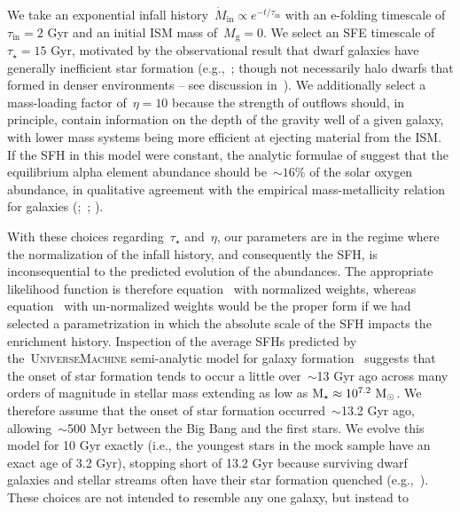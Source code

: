 We take an exponential infall history~$\dot{M}_\text{in} \propto e^{-t /
\tau_\text{in}}$ with an e-folding timescale of~$\tau_\text{in} = 2$ Gyr and an
initial ISM mass of~$M_\text{g} = 0$.
We select an SFE timescale of~$\tau_\star = 15$ Gyr, motivated by the
observational result that dwarf galaxies have generally inefficient star
formation (e.g.,~\citealp{Hudson2015}; though not necessarily halo dwarfs that
formed in denser environments -- see discussion in~\citealt{Naidu2022}).
We additionally select a mass-loading factor of~$\eta = 10$ because the
strength of outflows should, in principle, contain information on the depth of
the gravity well of a given galaxy, with lower mass systems being more
efficient at ejecting material from the ISM.
If the SFH in this model were constant, the analytic formulae of
\citet{Weinberg2017b} suggest that the equilibrium alpha element abundance
should be~$\sim16$\% of the solar oxygen abundance, in qualitative agreement
with the empirical mass-metallicity relation for galaxies
(\citealp{Tremonti2004, Gallazzi2005};~\citealp*{Zahid2011};
\citealp{Andrews2013, Kirby2013, Zahid2014}).
\par
With these choices regarding~$\tau_\star$ and~$\eta$, our parameters are in
the regime where the normalization of the infall history, and consequently the
SFH, is inconsequential to the predicted evolution of the abundances.
The appropriate likelihood function is therefore equation~
with normalized weights, whereas equation~ with
un-normalized weights would be the proper form if we had selected a
parametrization in which the absolute scale of the SFH impacts the enrichment
history.
Inspection of the average SFHs predicted by the~\textsc{UniverseMachine}
semi-analytic model for galaxy formation~\citep{Behroozi2019} suggests that the
onset of star formation tends to occur a little over~$\sim$13 Gyr ago across
many orders of magnitude in stellar mass extending as low as
$\text{M}_\star \approx 10^{7.2}~\text{M}_\odot$.
We therefore assume that the onset of star formation occurred~$\sim$13.2 Gyr
ago, allowing~$\sim$500 Myr between the Big Bang and the first stars.
We evolve this model for 10 Gyr exactly (i.e., the youngest stars in the mock
sample have an exact age of 3.2 Gyr), stopping short of 13.2 Gyr because
surviving dwarf galaxies and stellar streams often have their star formation
quenched (e.g.,~\citealp{Monelli2010a, Monelli2010b, Sohn2013, Weisz2014a,
Weisz2014b, Weisz2015}).
These choices are not intended to resemble any one galaxy, but instead to
